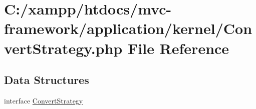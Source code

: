 \hypertarget{_convert_strategy_8php}{}\section{C\+:/xampp/htdocs/mvc-\/framework/application/kernel/\+Convert\+Strategy.php File Reference}
\label{_convert_strategy_8php}
\subsection*{Data Structures}
\begin{DoxyCompactItemize}
\item 
interface \hyperlink{interface_convert_strategy}{Convert\+Strategy}
\end{DoxyCompactItemize}
